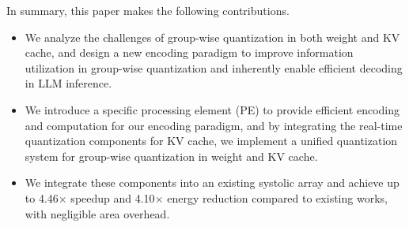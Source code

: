 In summary, this paper makes the following contributions.

\begin{itemize}[leftmargin=*]
	\item We analyze the challenges of group-wise quantization in both weight and KV cache, and design a new encoding paradigm to improve information utilization in group-wise quantization and inherently enable efficient decoding in LLM inference.
    \item We introduce a specific processing element (PE) to provide efficient encoding and computation for our encoding paradigm, and by integrating the real-time quantization components for KV cache, we implement a unified quantization system for group-wise quantization in weight and KV cache.
    \item We integrate these components into an existing systolic array and achieve up to 4.46$\times$ speedup and 4.10$\times$ energy reduction compared to existing works, with negligible area overhead.
\end{itemize}
